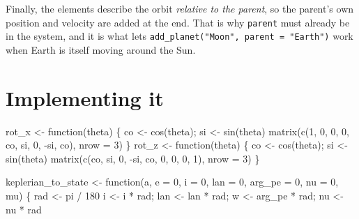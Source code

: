 \documentclass[
  10.5pt,
  letterpaper,
]{scrbook}
\newenvironment{Shaded}{\begin{snugshade}}{\end{snugshade}}
\newcommand{\AttributeTok}[1]{\textcolor[rgb]{0.00,0.00,0.00}{#1}}
\newcommand{\ControlFlowTok}[1]{\textcolor[rgb]{0.00,0.00,0.00}{#1}}
\newcommand{\DecValTok}[1]{\textcolor[rgb]{0.00,0.00,0.00}{#1}}
\newcommand{\FunctionTok}[1]{\textcolor[rgb]{0.00,0.00,0.00}{#1}}
\newcommand{\NormalTok}[1]{\textcolor[rgb]{0.00,0.00,0.00}{#1}}
\newcommand{\OtherTok}[1]{\textcolor[rgb]{0.00,0.00,0.00}{#1}}
\newcommand{\SpecialCharTok}[1]{\textcolor[rgb]{0.00,0.00,0.00}{#1}}
\theoremstyle{plain}
\theoremstyle{remark}
\begin{document}
Finally, the elements describe the orbit \emph{relative to the parent},
so the parent's own position and velocity are added at the end. That is
why \texttt{parent} must already be in the system, and it is what lets
\texttt{add\_planet("Moon",\ parent\ =\ "Earth")} work when Earth is
itself moving around the Sun.

\section{Implementing it}\label{implementing-it}

\begin{Shaded}
\begin{Highlighting}[]
\NormalTok{rot\_x }\OtherTok{\textless{}{-}} \ControlFlowTok{function}\NormalTok{(theta) \{}
\NormalTok{  co }\OtherTok{\textless{}{-}} \FunctionTok{cos}\NormalTok{(theta); si }\OtherTok{\textless{}{-}} \FunctionTok{sin}\NormalTok{(theta)}
  \FunctionTok{matrix}\NormalTok{(}\FunctionTok{c}\NormalTok{(}\DecValTok{1}\NormalTok{, }\DecValTok{0}\NormalTok{, }\DecValTok{0}\NormalTok{,   }\DecValTok{0}\NormalTok{, co, si,   }\DecValTok{0}\NormalTok{, }\SpecialCharTok{{-}}\NormalTok{si, co), }\AttributeTok{nrow =} \DecValTok{3}\NormalTok{)}
\NormalTok{\}}
\NormalTok{rot\_z }\OtherTok{\textless{}{-}} \ControlFlowTok{function}\NormalTok{(theta) \{}
\NormalTok{  co }\OtherTok{\textless{}{-}} \FunctionTok{cos}\NormalTok{(theta); si }\OtherTok{\textless{}{-}} \FunctionTok{sin}\NormalTok{(theta)}
  \FunctionTok{matrix}\NormalTok{(}\FunctionTok{c}\NormalTok{(co, si, }\DecValTok{0}\NormalTok{,   }\SpecialCharTok{{-}}\NormalTok{si, co, }\DecValTok{0}\NormalTok{,   }\DecValTok{0}\NormalTok{, }\DecValTok{0}\NormalTok{, }\DecValTok{1}\NormalTok{), }\AttributeTok{nrow =} \DecValTok{3}\NormalTok{)}
\NormalTok{\}}

\NormalTok{keplerian\_to\_state }\OtherTok{\textless{}{-}} \ControlFlowTok{function}\NormalTok{(a, }\AttributeTok{e =} \DecValTok{0}\NormalTok{, }\AttributeTok{i =} \DecValTok{0}\NormalTok{, }\AttributeTok{lan =} \DecValTok{0}\NormalTok{, }\AttributeTok{arg\_pe =} \DecValTok{0}\NormalTok{,}
                               \AttributeTok{nu =} \DecValTok{0}\NormalTok{, mu) \{}
\NormalTok{  rad }\OtherTok{\textless{}{-}}\NormalTok{ pi }\SpecialCharTok{/} \DecValTok{180}
\NormalTok{  i }\OtherTok{\textless{}{-}}\NormalTok{ i }\SpecialCharTok{*}\NormalTok{ rad; lan }\OtherTok{\textless{}{-}}\NormalTok{ lan }\SpecialCharTok{*}\NormalTok{ rad; w }\OtherTok{\textless{}{-}}\NormalTok{ arg\_pe }\SpecialCharTok{*}\NormalTok{ rad; nu }\OtherTok{\textless{}{-}}\NormalTok{ nu }\SpecialCharTok{*}\NormalTok{ rad}


\end{Highlighting}
\end{Shaded}
\end{document}
